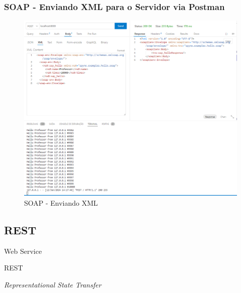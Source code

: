 \documentclass[
	10pt, %
	t, %
]{beamer}
\begin{document}
\begin{frame}[fragile]
	\frametitle{SOAP - Enviando XML para o Servidor via Postman}
	
	\begin{figure}
		\includegraphics[width=0.7\linewidth]{soap_http_request_example.PNG}
		\caption{SOAP - Enviando XML}
		\label{fig:soap_server_xml_2}
	\end{figure}

\end{frame}


\subsection{REST}

\begin{frame}
	\begin{center}
		
		\bigskip\bigskip\bigskip\bigskip %
		{\Large Web Service}
		
		\bigskip\bigskip %
		{\Huge REST}
		
		\smallskip
		{\small \textit{Representational State Transfer}}
	\end{center}

\end{frame}
\end{document}
